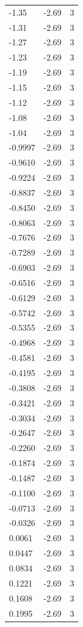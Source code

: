 \begin{longtable}{lrr}
  -1.35 & -2.69 & 3 \\
  -1.31 & -2.69 & 3 \\
  -1.27 & -2.69 & 3 \\
  -1.23 & -2.69 & 3 \\
  -1.19 & -2.69 & 3 \\
  -1.15 & -2.69 & 3 \\
  -1.12 & -2.69 & 3 \\
  -1.08 & -2.69 & 3 \\
  -1.04 & -2.69 & 3 \\
  -0.9997 & -2.69 & 3 \\
  -0.9610 & -2.69 & 3 \\
  -0.9224 & -2.69 & 3 \\
  -0.8837 & -2.69 & 3 \\
  -0.8450 & -2.69 & 3 \\
  -0.8063 & -2.69 & 3 \\
  -0.7676 & -2.69 & 3 \\
  -0.7289 & -2.69 & 3 \\
  -0.6903 & -2.69 & 3 \\
  -0.6516 & -2.69 & 3 \\
  -0.6129 & -2.69 & 3 \\
  -0.5742 & -2.69 & 3 \\
  -0.5355 & -2.69 & 3 \\
  -0.4968 & -2.69 & 3 \\
  -0.4581 & -2.69 & 3 \\
  -0.4195 & -2.69 & 3 \\
  -0.3808 & -2.69 & 3 \\
  -0.3421 & -2.69 & 3 \\
  -0.3034 & -2.69 & 3 \\
  -0.2647 & -2.69 & 3 \\
  -0.2260 & -2.69 & 3 \\
  -0.1874 & -2.69 & 3 \\
  -0.1487 & -2.69 & 3 \\
  -0.1100 & -2.69 & 3 \\
  -0.0713 & -2.69 & 3 \\
  -0.0326 & -2.69 & 3 \\
  0.0061 & -2.69 & 3 \\
  0.0447 & -2.69 & 3 \\
  0.0834 & -2.69 & 3 \\
  0.1221 & -2.69 & 3 \\
  0.1608 & -2.69 & 3 \\
  0.1995 & -2.69 & 3 \\

\end{longtable}
